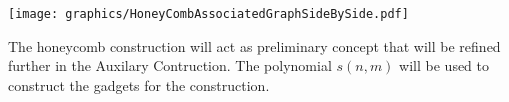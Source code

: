 
\begin{minipage}{\linewidth}
\begin{center}
\texttt{[image: graphics/HoneyCombAssociatedGraphSideBySide.pdf]}
\label{fig:HoneyCombAssociatedGraphSmall}
\end{center}
\end{minipage}

The honeycomb construction will act as preliminary concept that will be refined further in the Auxilary Contruction.
The polynomial $s(n,m)$ will be used to construct the gadgets for the construction.
